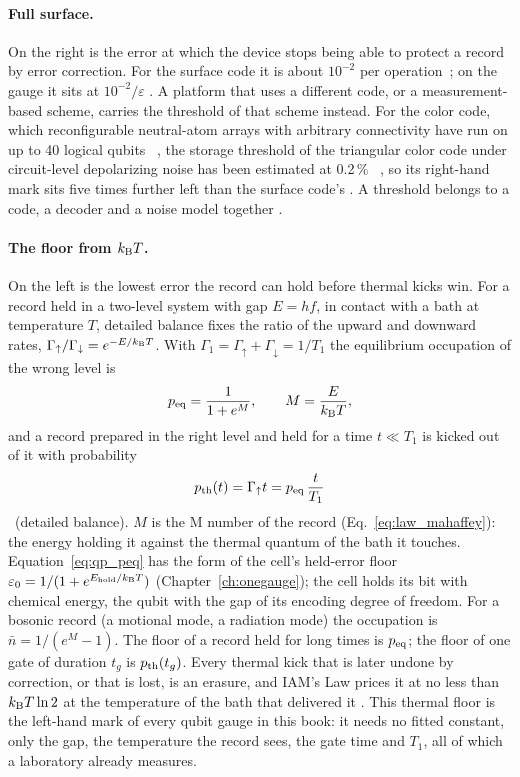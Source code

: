 \paragraph{Full surface.} On the right is the error at which the device stops being able to protect a record by error correction.
For the surface code it is about $10^{-2}$ per operation~\cite{Fowler2012}; on the gauge it sits at $10^{-2}/\varepsilon$ \calc. A
platform that uses a different code, or a measurement-based scheme, carries the threshold of that scheme instead. For the color code, which reconfigurable neutral-atom arrays with arbitrary connectivity have run on up to 40 logical
qubits~\cite{Bluvstein2024} \observed, the storage threshold of the triangular color code under circuit-level depolarizing noise has been
estimated at 0.2\,\%~\cite{Chamberland2020NJP} \observed, so its right-hand mark sits five times further left than the surface code's
\calc. A threshold belongs to a code, a decoder and a noise model together \interp.

\paragraph{The floor from $k_{\mathrm B} T$.} On the left is the lowest error the record can hold before thermal kicks win. For a record held
in a two-level system with gap $E=hf$, in contact with a bath at temperature $T$, detailed balance fixes the ratio of the upward and
downward rates, $\Gamma_\uparrow/\Gamma_\downarrow=e^{-E/k_{\mathrm B} T}$. With $\Gamma_1=\Gamma_\uparrow+\Gamma_\downarrow=1/T_1$ the equilibrium
occupation of the wrong level is
\begin{equation}
 p_{\rm eq}=\frac{1}{1+e^{M}},\qquad M=\frac{E}{k_{\mathrm B} T},
 \label{eq:qp_peq}
\end{equation}
and a record prepared in the right level and held for a time $t\ll T_1$ is kicked out of it with probability
\begin{equation}
 p_{\rm th}(t)=\Gamma_\uparrow t=p_{\rm eq}\,\frac{t}{T_1}
 \label{eq:qp_pth}
\end{equation}
\derived\ (detailed balance). $M$ is the M number of the record (Eq.~\eqref{eq:law_mahaffey}): the energy holding it against
the thermal quantum of the bath it touches. Equation~\eqref{eq:qp_peq} has the form of the cell's held-error floor
$\varepsilon_0=1/(1+e^{E_{\rm hold}/k_{\mathrm B} T})$ (Chapter~\ref{ch:onegauge}); the cell holds its bit with chemical energy, the qubit with
the gap of its encoding degree of freedom. For a bosonic record (a motional mode, a radiation mode) the occupation is
$\bar n=1/(e^{M}-1)$. The floor of a record held for long times is $p_{\rm eq}$; the floor of one gate of duration $t_g$ is
$p_{\rm th}(t_g)$. Every thermal kick that is later undone by correction, or that is lost, is an erasure, and IAM's Law prices it at no
less than $k_{\mathrm B} T\ln2$ at the temperature of the bath that delivered it \interp. This thermal floor is the left-hand mark of every qubit
gauge in this book: it needs no fitted constant, only the gap, the temperature the record sees, the gate time and $T_1$, all of which a
laboratory already measures.

